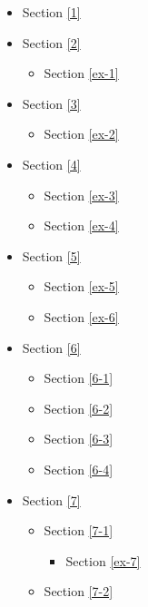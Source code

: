\documentclass[11pt]{article}
\providecommand{\tightlist}{%
      \setlength{\itemsep}{0pt}\setlength{\parskip}{0pt}}
\begin{document}
\begin{itemize}
\tightlist
\item
  Section \ref{1}
\item
  Section \ref{2}

  \begin{itemize}
  \tightlist
  \item
    Section \ref{ex-1}
  \end{itemize}
\item
  Section \ref{3}

  \begin{itemize}
  \tightlist
  \item
    Section \ref{ex-2}
  \end{itemize}
\item
  Section \ref{4}

  \begin{itemize}
  \tightlist
  \item
    Section \ref{ex-3}
  \item
    Section \ref{ex-4}
  \end{itemize}
\item
  Section \ref{5}

  \begin{itemize}
  \tightlist
  \item
    Section \ref{ex-5}
  \item
    Section \ref{ex-6}
  \end{itemize}
\item
  Section \ref{6}

  \begin{itemize}
  \tightlist
  \item
    Section \ref{6-1}
  \item
    Section \ref{6-2}
  \item
    Section \ref{6-3}
  \item
    Section \ref{6-4}
  \end{itemize}
\item
  Section \ref{7}

  \begin{itemize}
  \tightlist
  \item
    Section \ref{7-1}

    \begin{itemize}
    \tightlist
    \item
      Section \ref{ex-7}
    \end{itemize}
  \item
    Section \ref{7-2}


\end{itemize}
\end{itemize}
\end{document}
